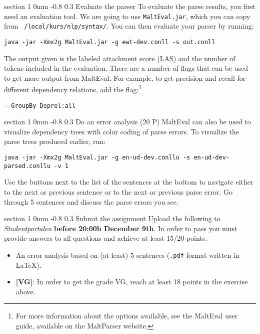 \documentclass[11pt]{article}
\makeatletter
\newcommand{\newsec}[2]{\section{#1}\label{sec:#2}\noindent}
\renewcommand{\section}{\@startsection
{section}%
{1}%
{0mm}%
{-0.8\baselineskip}%
{0.3\baselineskip}%
{\bfseries\large}}%
\makeatother
\begin{document}
\newsec{Evaluate the parser}{eval}%
To evaluate the parse results, you first need an evaluation tool. We
are going to use {\tt MaltEval.jar}, which you can copy from {\tt
  /local/kurs/nlp/syntax/}. You can then evaluate your parser by
running:
\begin{small}
\begin{verbatim}
java -jar -Xmx2g MaltEval.jar -g ewt-dev.conll -s out.conll
\end{verbatim}
\end{small}
The output given is the labeled attachment score (LAS) and the number
of tokens included in the evaluation. There are a number of flags that
can be used to get more output from MaltEval. For example, to get
precision and recall for different dependency relations, add the
flag:\footnote{For more information about the options available, see
  the MaltEval user guide, available on the MaltParser website.}
\begin{small}
\begin{verbatim}
--GroupBy Deprel:all
\end{verbatim}
\end{small}

\newsec{Do an error analysis (20 P)}{err}%
MaltEval can also be used to visualize dependency trees with color
coding of parse errors. To visualize the parse trees produced earlier,
run:
\begin{small}
\begin{verbatim}
java -jar -Xmx2g MaltEval.jar -g en-ud-dev.conllu -s en-ud-dev-parsed.conllu -v 1
\end{verbatim}
\end{small}
Use the buttons next to the list of the sentences at the bottom to
navigate either to the next or previous sentence or to the next or
previous parse error.
Go through 5 sentences and discuss the parse errors you see.

\newsec{Submit the assignment}{sub}%
Upload the following to {\it Studentportalen} \textbf{before 20:00h
  December 9th}. In order to pass you must provide answers to all
questions and achieve at least 15/20 points.
\begin{itemize}[noitemsep,topsep=0.2cm]
\item An error analysis based on (at least) 5 sentences (\texttt{.pdf}
  format written in \LaTeX).
\item \textbf{[VG]}: In order to get the grade VG, reach at least 18
  points in the exercise above.
\end{itemize}
\end{document}
